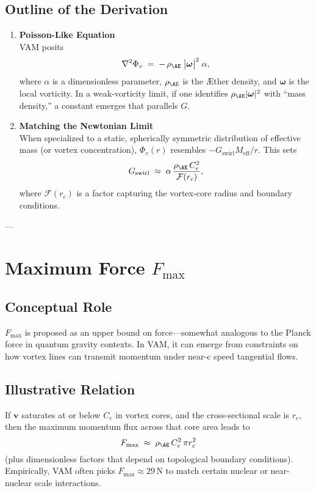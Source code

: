 \documentclass[aps,preprint,superscriptaddress]{revtex4-2}
\begin{document}
    \subsection{Outline of the Derivation}
    \begin{enumerate}
        \item \textbf{Poisson-Like Equation} \\
    VAM posits
    \[
        \nabla^2 \Phi_v
        \;=\;
        -\,\rho_{\mathrm{\AE}}\;\bigl|\boldsymbol{\omega}\bigr|^2 \; \alpha,
    \]
    where \(\alpha\) is a dimensionless parameter, \(\rho_{\mathrm{\AE}}\) is the Æther density, and \(\boldsymbol{\omega}\) is the local vorticity. In a weak-vorticity limit, if one identifies \(\rho_{\mathrm{\AE}} |\boldsymbol{\omega}|^2\) with “mass density,” a constant emerges that parallels \(G\).

        \item \textbf{Matching the Newtonian Limit} \\
    When specialized to a static, spherically symmetric distribution of effective mass (or vortex concentration), \(\Phi_v(r)\) resembles \(-G_{\text{swirl}} M_{\text{eff}}/r\). This sets
    \[
        G_{\text{swirl}}
        \;\approx\;
        \alpha \,\frac{\rho_{\mathrm{\AE}}\,C_e^2}{\mathcal{F}(r_c)},
    \]
    where \(\mathcal{F}(r_c)\) is a factor capturing the vortex-core radius and boundary conditions.
    \end{enumerate}

    ---

    \section{Maximum Force \(F_{\text{max}}\)}

    \subsection{Conceptual Role}
    \(F_{\text{max}}\) is proposed as an upper bound on force—somewhat analogous to the Planck force in quantum gravity contexts. In VAM, it can emerge from constraints on how vortex lines can transmit momentum under near-c speed tangential flows.

    \subsection{Illustrative Relation}
    If \(\mathbf{v}\) saturates at or below \(C_e\) in vortex cores, and the cross-sectional scale is \(r_c\), then the maximum momentum flux across that core area leads to
    \[
        F_{\text{max}}
        \;\approx\;
        \rho_{\mathrm{\AE}}\, C_e^2\, \pi r_c^2
    \]
    (plus dimensionless factors that depend on topological boundary conditions). Empirically, VAM often picks \(F_{\text{max}}\approx 29\,\mathrm{N}\) to match certain nuclear or near-nuclear scale interactions.
\end{document}
